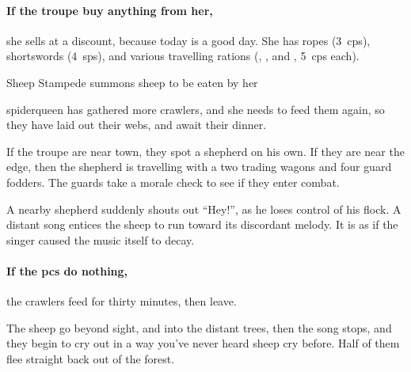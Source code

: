 \paragraph{If the troupe buy anything from her,}
she sells at a discount, because today is a good day.
She has ropes (3~\glspl{cp}), shortswords (4~\glspl{sp}), and various travelling rations (\rations, \rations, and \rations, 5~\glspl{cp} each).


{Sheep Stampede}%
{ summons sheep to be eaten by her }%

\begin{exampletext}
  \Gls{spiderqueen} has gathered more \glspl{crawler}, and she needs to feed them again, so they have laid out their webs, and await their dinner.
\end{exampletext}

If the troupe are near town, they spot a shepherd on his own.
If they are near the \gls{edge}, then the shepherd is travelling with a two trading wagons and four \gls{guard} \glspl{fodder}. 
The \glspl{guard} take a morale check to see if they enter combat.%


\begin{boxtext}
  A nearby shepherd suddenly shouts out ``Hey!'', as he loses control of his flock.
  A distant song entices the sheep to run toward its discordant melody. It is as if the singer caused the music itself to decay.
\end{boxtext}

\paragraph{If the \glspl{pc} do nothing,}
the \glspl{crawler} feed for thirty minutes, then leave.

\begin{boxtext}
  The sheep go beyond sight, and into the distant trees, then the song stops, and they begin to cry out in a way you've never heard sheep cry before.  Half of them flee straight back out of the forest.
\end{boxtext}

